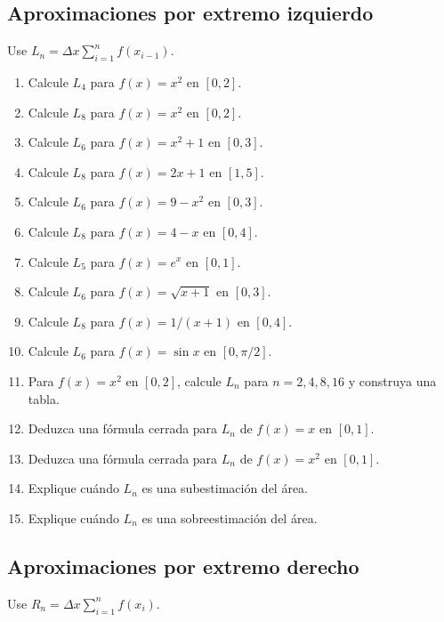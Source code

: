 \documentclass[12pt]{article}
\begin{document}
\subsection{Aproximaciones por extremo izquierdo}
Use $L_n=\Delta x\sum_{i=1}^{n}f(x_{i-1})$.

\begin{enumerate}[resume]
\item Calcule $L_4$ para $f(x)=x^2$ en $[0,2]$.
\item Calcule $L_8$ para $f(x)=x^2$ en $[0,2]$.
\item Calcule $L_6$ para $f(x)=x^2+1$ en $[0,3]$.
\item Calcule $L_8$ para $f(x)=2x+1$ en $[1,5]$.
\item Calcule $L_6$ para $f(x)=9-x^2$ en $[0,3]$.
\item Calcule $L_8$ para $f(x)=4-x$ en $[0,4]$.
\item Calcule $L_5$ para $f(x)=e^x$ en $[0,1]$.
\item Calcule $L_6$ para $f(x)=\sqrt{x+1}$ en $[0,3]$.
\item Calcule $L_8$ para $f(x)=1/(x+1)$ en $[0,4]$.
\item Calcule $L_6$ para $f(x)=\sin x$ en $[0,\pi/2]$.
\item Para $f(x)=x^2$ en $[0,2]$, calcule $L_n$ para $n=2,4,8,16$ y construya una tabla.
\item Deduzca una fórmula cerrada para $L_n$ de $f(x)=x$ en $[0,1]$.
\item Deduzca una fórmula cerrada para $L_n$ de $f(x)=x^2$ en $[0,1]$.
\item Explique cuándo $L_n$ es una subestimación del área.
\item Explique cuándo $L_n$ es una sobreestimación del área.
\end{enumerate}
\subsection{Aproximaciones por extremo derecho}
Use $R_n=\Delta x\sum_{i=1}^{n}f(x_i)$.
\end{document}
